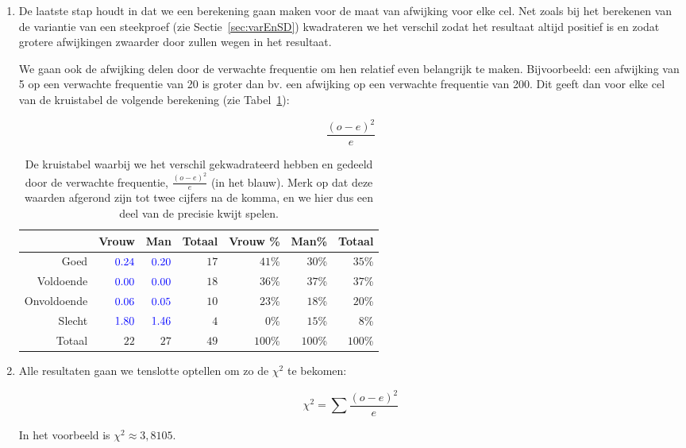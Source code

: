 \begin{enumerate}
  \item De laatste stap houdt in dat we een berekening gaan maken voor de maat van afwijking voor elke cel. Net zoals bij het berekenen van de variantie van een steekproef (zie Sectie~\ref{sec:varEnSD}) kwadrateren we het verschil zodat het resultaat altijd positief is en zodat grotere afwijkingen zwaarder door zullen wegen in het resultaat.
  
  We gaan ook de afwijking delen door de verwachte frequentie om hen relatief even belangrijk te maken. Bijvoorbeeld: een afwijking van 5 op een verwachte frequentie van 20 is groter dan bv. een afwijking op een verwachte frequentie van 200. Dit geeft dan voor elke cel van de kruistabel de volgende berekening (zie Tabel~\ref{tab:kruistabel3}):
  
  \begin{equation}
  \frac{(o - e)^{2}}{e}
  \end{equation}
  
  \begin{table} \centering
    \begin{tabular}{@{}rrrrrrr@{}}
    	\toprule
    	            &                    Vrouw &                      Man & Totaal & Vrouw \% &   Man\% &  Totaal \\
    	\midrule
    	       Goed & $\textcolor{blue}{0.24}$ & $\textcolor{blue}{0.20}$ &   $17$ &   $41$\% &  $30$\% &  $35$\% \\
    	  Voldoende & $\textcolor{blue}{0.00}$ & $\textcolor{blue}{0.00}$ &   $18$ &   $36$\% &  $37$\% &  $37$\% \\
    	Onvoldoende & $\textcolor{blue}{0.06}$ & $\textcolor{blue}{0.05}$ &   $10$ &   $23$\% &  $18$\% &  $20$\% \\
    	     Slecht & $\textcolor{blue}{1.80}$ & $\textcolor{blue}{1.46}$ &    $4$ &    $0$\% &  $15$\% &   $8$\% \\
    	     Totaal &                     $22$ &                     $27$ &   $49$ &  $100$\% & $100$\% & $100$\% \\
    	\bottomrule
    \end{tabular}
    \caption{De kruistabel waarbij we het verschil gekwadrateerd hebben en gedeeld door de verwachte frequentie, $\frac{(o - e)^2}{e}$ (in het blauw). Merk op dat deze waarden afgerond zijn tot twee cijfers na de komma, en we hier dus een deel van de precisie kwijt spelen.}
    \label{tab:kruistabel3}
  \end{table}
  
  \item Alle resultaten gaan we tenslotte optellen om zo de $\chi^{2}$ te bekomen:
  
  \begin{equation}
  \chi^{2} = \sum \frac{(o - e)^{2}}{e}
  \end{equation}
  
  In het voorbeeld is $\chi^2 \approx 3,8105$.
\end{enumerate}

